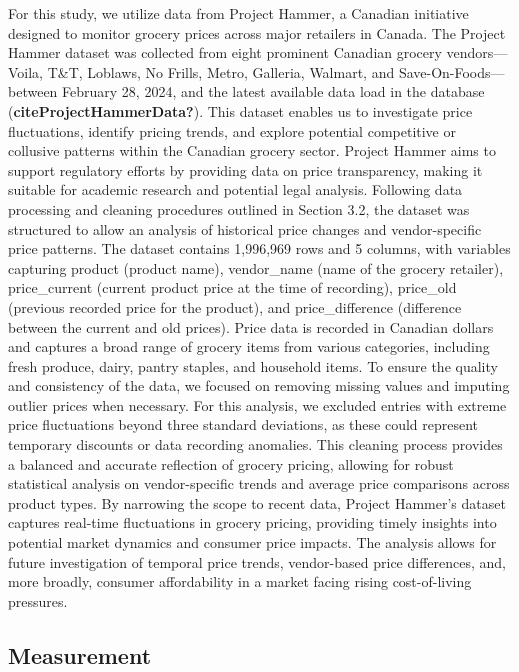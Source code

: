 \documentclass[
  letterpaper,
  DIV=11,
  numbers=noendperiod]{scrartcl}
\begin{document}
For this study, we utilize data from Project Hammer, a Canadian
initiative designed to monitor grocery prices across major retailers in
Canada. The Project Hammer dataset was collected from eight prominent
Canadian grocery vendors---Voila, T\&T, Loblaws, No Frills, Metro,
Galleria, Walmart, and Save-On-Foods---between February 28, 2024, and
the latest available data load in the database
(\textbf{citeProjectHammerData?}). This dataset enables us to
investigate price fluctuations, identify pricing trends, and explore
potential competitive or collusive patterns within the Canadian grocery
sector. Project Hammer aims to support regulatory efforts by providing
data on price transparency, making it suitable for academic research and
potential legal analysis. Following data processing and cleaning
procedures outlined in Section 3.2, the dataset was structured to allow
an analysis of historical price changes and vendor-specific price
patterns. The dataset contains 1,996,969 rows and 5 columns, with
variables capturing product (product name), vendor\_name (name of the
grocery retailer), price\_current (current product price at the time of
recording), price\_old (previous recorded price for the product), and
price\_difference (difference between the current and old prices). Price
data is recorded in Canadian dollars and captures a broad range of
grocery items from various categories, including fresh produce, dairy,
pantry staples, and household items. To ensure the quality and
consistency of the data, we focused on removing missing values and
imputing outlier prices when necessary. For this analysis, we excluded
entries with extreme price fluctuations beyond three standard
deviations, as these could represent temporary discounts or data
recording anomalies. This cleaning process provides a balanced and
accurate reflection of grocery pricing, allowing for robust statistical
analysis on vendor-specific trends and average price comparisons across
product types. By narrowing the scope to recent data, Project Hammer's
dataset captures real-time fluctuations in grocery pricing, providing
timely insights into potential market dynamics and consumer price
impacts. The analysis allows for future investigation of temporal price
trends, vendor-based price differences, and, more broadly, consumer
affordability in a market facing rising cost-of-living pressures.

\subsection{Measurement}\label{measurement}
\end{document}
